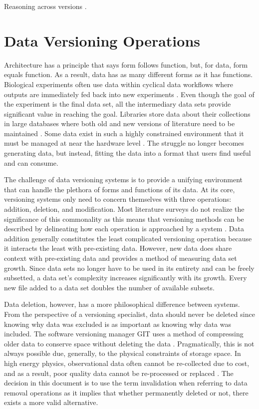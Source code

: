 Reasoning across versions \cite{tan2004research}.

\section{Data Versioning Operations}

Architecture has a principle that says form follows function, but, for data, form equals function.
As a result, data has as many different forms as it has functions.
Biological experiments often use data within cyclical data workflows where outputs are immediately fed back into new experiments \cite{Tagger2005}.
Even though the goal of the experiment is the final data set, all the intermediary data sets provide significant value in reaching the goal.
Libraries store data about their collections in large databases where both old and new versions of literature need to be maintained \cite{Wiil:2000:RDH:338407.338517}.
Some data exist in such a highly constrained environment that it must be managed at near the hardware level \cite{Flouris04clotho:transparent}.
The struggle no longer becomes generating data, but instead, fitting the data into a format that users find useful and can consume.

The challenge of data versioning systems is to provide a unifying environment that can handle the plethora of forms and functions of its data.
At its core, versioning systems only need to concern themselves with three operations: addition, deletion, and modification.
Most literature surveys do not realize the significance of this commonality as this means that versioning methods can be described by delineating how each operation is approached by a system \cite{Tagger2005} \cite{rohtua}.
Data addition generally constitutes the least complicated versioning operation because it interacts the least with pre-existing data.
However, new data does share context with pre-existing data and provides a method of measuring data set growth.
Since data sets no longer have to be used in its entirety and can be freely subsetted, a data set's complexity increases significantly with its growth.
Every new file added to a data set doubles the number of available subsets.

Data deletion, however, has a more philosophical difference between systems.
From the perspective of a versioning specialist, data should never be deleted since knowing why data was excluded is as important as knowing why data was included.
The software versioning manager GIT uses a method of compressing older data to conserve space without deleting the data \cite{Chacon:2009:PG:1618548}.
Pragmatically, this is not always possible due, generally, to the physical constraints of storage space.
In high energy physics, observational data often cannot be re-collected due to cost, and as a result, poor quality data cannot be re-processed or replaced \cite{Cavanaugh2002}.
The decision in this document is to use the term invalidation when referring to data removal operations as it implies that whether permanently deleted or not, there exists a more valid alternative.

